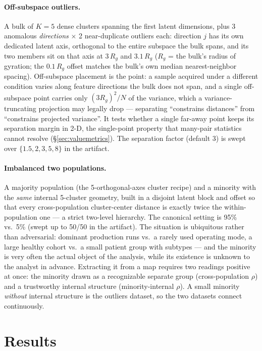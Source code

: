 \documentclass[11pt]{article}
\begin{document}
\paragraph{Off-subspace outliers.} A bulk of $K{=}5$ dense clusters spanning
the first latent dimensions, plus 3 anomalous \emph{directions} $\times$ 2
near-duplicate outliers each: direction $j$ has its own dedicated latent
axis, orthogonal to the entire subspace the bulk spans, and its two members
sit on that axis at $3\,R_g$ and $3.1\,R_g$ ($R_g$ = the bulk's radius of
gyration; the $0.1\,R_g$ offset matches the bulk's own median
nearest-neighbor spacing). Off-subspace placement is the point: a sample
acquired under a different condition varies along feature directions the
bulk does not span, and a single off-subspace point carries only
$(3 R_g)^2/N$ of the variance, which a variance-truncating projection may
legally drop --- separating ``constrains distances'' from ``constrains
projected variance''. It tests whether a single far-away point keeps its
separation margin in 2-D, the single-point property that many-pair
statistics cannot resolve (\S\ref{sec:valuemetrics}). The separation factor
(default 3) is swept over $\{1.5, 2, 3, 5, 8\}$ in the artifact.

\paragraph{Imbalanced two populations.} A majority population (the
5-orthogonal-axes cluster recipe) and a minority with the \emph{same}
internal 5-cluster geometry, built in a disjoint latent block and offset so
that every cross-population cluster-center distance is exactly twice the
within-population one --- a strict two-level hierarchy. The canonical
setting is 95\% vs.\ 5\% (swept up to 50/50 in the artifact). The situation
is ubiquitous rather than adversarial: dominant production runs vs.\ a
rarely used operating mode, a large healthy cohort vs.\ a small patient
group with subtypes --- and the minority is very often the actual object of
the analysis, while its existence is unknown to the analyst in advance.
Extracting it from a map requires two readings positive at once: the
minority drawn as a recognizable separate group (cross-population $\rho$)
and a trustworthy internal structure (minority-internal $\rho$). A small
minority \emph{without} internal structure is the outliers dataset, so the
two datasets connect continuously.

\section{Results}
\label{sec:results}
\end{document}

